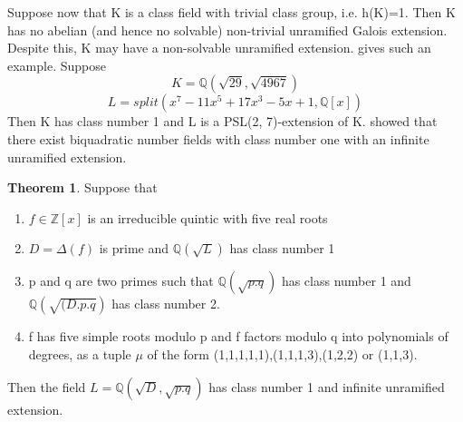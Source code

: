 \documentclass[12pt]{extarticle}
\newcommand{\<}{\langle}
\renewcommand{\>}{\rangle}
\theoremstyle{definition}
\newtheorem{theorem}{Theorem}
\begin{document}
Suppose now that K is a class field with trivial class group, i.e. h(K)=1. Then K has no abelian (and hence no
solvable) non-trivial unramified Galois extension. Despite this, K may have a non-solvable unramified extension. \cite{BRINK} gives such an example. Suppose
\begin{equation}
   K=\mathbb{Q}(\sqrt{29},\sqrt{4967}) 
\end{equation}
\begin{equation}
   L=split(x^7 - 11x^5 + 17x^3 - 5x + 1,\mathbb{Q}[x])
\end{equation}
Then K has class number 1 and L is a PSL(2, 7)-extension of K.
\cite{MAIR} showed that there exist biquadratic number fields with class number one with an infinite unramified extension. 
\begin{theorem}
\cite{BRINK} Suppose that \begin{enumerate}
    \item $f\in \mathbb{Z}[x]$ is an irreducible quintic with five real roots
    \item $D=\Delta(f)$ is prime and $\mathbb{Q}(\sqrt{L})$ has class number 1
    \item p and q are two primes such that $\mathbb{Q}(\sqrt{p.q})$ has class number 1 and $\mathbb{Q}(\sqrt{(D.p.q})$ has class number 2.
    \item f has five simple roots modulo p and f factors modulo q into polynomials of degrees, as a tuple $\mu$ of the form (1,1,1,1,1),(1,1,1,3),(1,2,2) or (1,1,3).
\end{enumerate}
Then the field $L=\mathbb{Q}(\sqrt{D},\sqrt{p.q})$ has class number 1 and infinite unramified extension.
\end{theorem}
\end{document}
